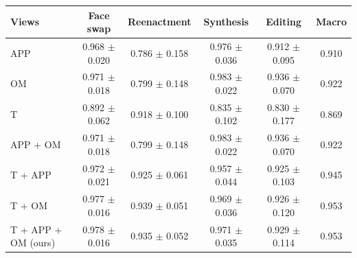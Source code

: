 \begin{tabular}{lccccc}
\toprule
Views & Face swap & Reenactment & Synthesis & Editing & Macro \\
\midrule
APP & 0.968 $\pm$ 0.020 & 0.786 $\pm$ 0.158 & 0.976 $\pm$ 0.036 & 0.912 $\pm$ 0.095 & 0.910 \\
OM & 0.971 $\pm$ 0.018 & 0.799 $\pm$ 0.148 & 0.983 $\pm$ 0.022 & 0.936 $\pm$ 0.070 & 0.922 \\
T & 0.892 $\pm$ 0.062 & 0.918 $\pm$ 0.100 & 0.835 $\pm$ 0.102 & 0.830 $\pm$ 0.177 & 0.869 \\
APP + OM & 0.971 $\pm$ 0.018 & 0.799 $\pm$ 0.148 & 0.983 $\pm$ 0.022 & 0.936 $\pm$ 0.070 & 0.922 \\
T + APP & 0.972 $\pm$ 0.021 & 0.925 $\pm$ 0.061 & 0.957 $\pm$ 0.044 & 0.925 $\pm$ 0.103 & 0.945 \\
T + OM & 0.977 $\pm$ 0.016 & 0.939 $\pm$ 0.051 & 0.969 $\pm$ 0.036 & 0.926 $\pm$ 0.120 & 0.953 \\
T + APP + OM (ours) & 0.978 $\pm$ 0.016 & 0.935 $\pm$ 0.052 & 0.971 $\pm$ 0.035 & 0.929 $\pm$ 0.114 & 0.953 \\
\bottomrule
\end{tabular}
